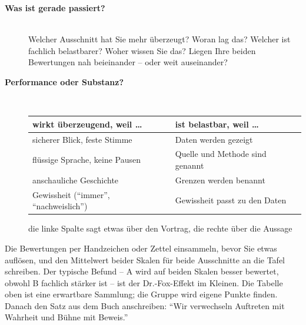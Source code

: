 \begin{description}
\item[{\rot\bf Was ist gerade passiert?}]~\\[-\lblskip]
\bi
  \ite Welcher Ausschnitt hat Sie mehr überzeugt? Woran lag das?
  \ite Welcher ist fachlich belastbarer? Woher wissen Sie das?
  \ite Liegen Ihre beiden Bewertungen nah beieinander -- oder weit
    auseinander?
\ei
\os{\newpage}

\item[{\rot\bf Performance oder Substanz?}]~\\[-\lblskip]
\begin{center}\nsl{\small}
\begin{tabular}{p{}p{}}
\toprule
\textbf{wirkt überzeugend, weil \ldots} & \textbf{ist belastbar, weil \ldots} \\
\midrule
sicherer Blick, feste Stimme & Daten werden gezeigt \\
flüssige Sprache, keine Pausen & Quelle und Methode sind genannt \\
anschauliche Geschichte & Grenzen werden benannt \\
Gewissheit (\enquote{immer}, \enquote{nachweislich}) & Gewissheit passt zu den Daten \\
\bottomrule
\end{tabular}
\end{center}
\bi
  \ite die linke Spalte sagt etwas über den Vortrag, die rechte über die
    Aussage
\ei
\os{\newpage}
\end{description}

\begin{lehrhinweis}
Die Bewertungen per Handzeichen oder Zettel einsammeln, bevor Sie etwas
auflösen, und den Mittelwert beider Skalen für beide Ausschnitte an die
Tafel schreiben. Der typische Befund -- A wird auf beiden Skalen besser
bewertet, obwohl B fachlich stärker ist -- ist der Dr.-Fox-Effekt im
Kleinen. Die Tabelle oben ist eine erwartbare Sammlung; die Gruppe wird
eigene Punkte finden. Danach den Satz aus dem Buch anschreiben:
\enquote{Wir verwechseln Auftreten mit Wahrheit und Bühne mit Beweis.}
\end{lehrhinweis}

